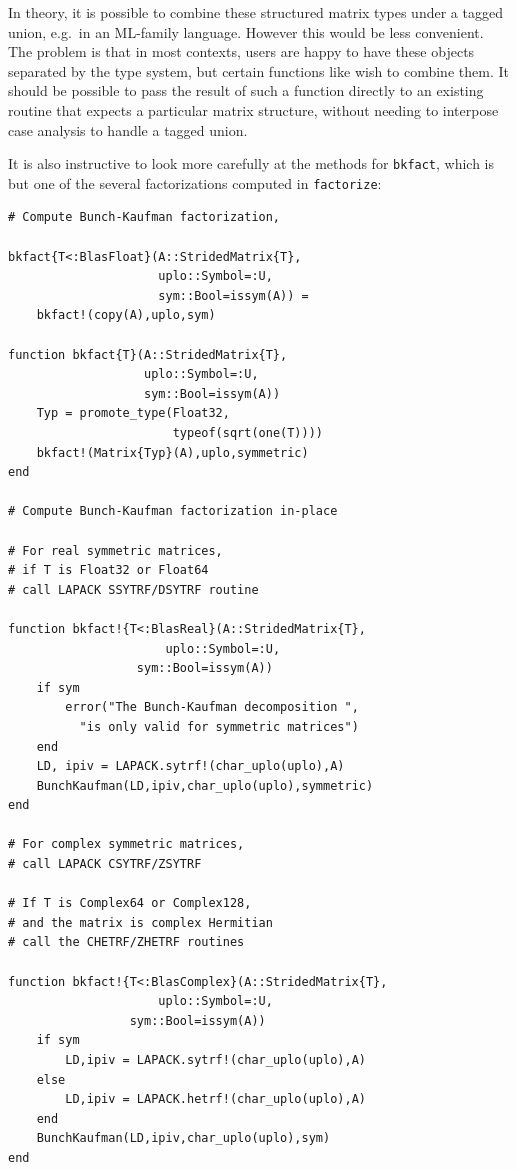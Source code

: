 \documentclass[10pt, preprint]{sigplanconf}
\begin{document}
In theory, it is possible to combine these structured matrix types under a
tagged union, e.g.\ in an ML-family language. However this would be
less convenient. The problem is that in most contexts,
users are happy to have these objects separated by the type system, but
certain functions like  wish to combine them. It should be
possible to pass the result of such a function directly to an existing
routine that expects a particular matrix structure, without needing to
interpose case analysis to handle a tagged union.

It is also instructive to look more carefully at the methods for \verb|bkfact|,
which is but one of the several factorizations computed in \verb|factorize|:

\begin{lstlisting}
# Compute Bunch-Kaufman factorization,

bkfact{T<:BlasFloat}(A::StridedMatrix{T},
                     uplo::Symbol=:U,
                     sym::Bool=issym(A)) =
    bkfact!(copy(A),uplo,sym)

function bkfact{T}(A::StridedMatrix{T},
                   uplo::Symbol=:U,
                   sym::Bool=issym(A))
    Typ = promote_type(Float32,
                       typeof(sqrt(one(T))))
    bkfact!(Matrix{Typ}(A),uplo,symmetric)
end

# Compute Bunch-Kaufman factorization in-place

# For real symmetric matrices,
# if T is Float32 or Float64
# call LAPACK SSYTRF/DSYTRF routine

function bkfact!{T<:BlasReal}(A::StridedMatrix{T},
		              uplo::Symbol=:U,
			      sym::Bool=issym(A))
    if sym
        error("The Bunch-Kaufman decomposition ",
	      "is only valid for symmetric matrices")
    end
    LD, ipiv = LAPACK.sytrf!(char_uplo(uplo),A)
    BunchKaufman(LD,ipiv,char_uplo(uplo),symmetric)
end

# For complex symmetric matrices,
# call LAPACK CSYTRF/ZSYTRF

# If T is Complex64 or Complex128,
# and the matrix is complex Hermitian
# call the CHETRF/ZHETRF routines

function bkfact!{T<:BlasComplex}(A::StridedMatrix{T},
	    			 uplo::Symbol=:U,
				 sym::Bool=issym(A))
    if sym
        LD,ipiv = LAPACK.sytrf!(char_uplo(uplo),A)
    else
        LD,ipiv = LAPACK.hetrf!(char_uplo(uplo),A)
    end
    BunchKaufman(LD,ipiv,char_uplo(uplo),sym)
end
\end{lstlisting}
\end{document}
